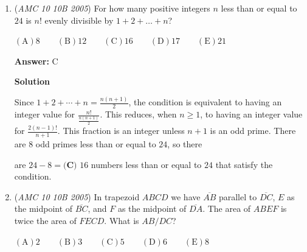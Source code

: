 \begin{enumerate}
 Hence, the answer is $\frac{q}{p} = \frac{45 \cdot 6 \cdot 4^2 \cdot 3^2}{10\cdot 4!} = \boxed{\textbf{(A) }162}$.

 



\textbf{Solution 2 (where the order does not matter)}

For probability $p$, there are $\binom{10}{1}=10$ ways to choose the number you want to show up $4$ times.

 Hence, the probability is $\frac{10}{\binom{40}{4}}$.

 For probability $q$, there are $\binom{10}{2}=45$ ways to choose the $2$ numbers you want to show up twice. There are $\binom{4}{2}\cdot\binom{4}{2}$ ways to pick which slips you want out of the $4$ of each.

 Hence, the probability is $\frac{45\cdot6\cdot6}{\binom{40}{4}}$

 Hence, $\frac{q}{p}=\frac{45\cdot6\cdot6}{10}=9\cdot6\cdot3=\boxed{\textbf{(A) }162}$.

 


	\item (\textit{AMC 10 10B 2005}) For how many positive integers $n$ less than or equal to $24$ is $n!$ evenly divisible by $1 + 2 + \ldots + n$?


 $\mathrm{(A)} 8 \qquad \mathrm{(B)} 12 \qquad \mathrm{(C)} 16 \qquad \mathrm{(D)} 17 \qquad \mathrm{(E)} 21$

 \textbf{Answer: }C



\textbf{Solution}

Since $1 + 2 + \cdots + n = \frac{n(n+1)}{2}$, the condition is equivalent to having an integer value for $\frac{n!} {\frac{n(n+1)}{2}}$. This reduces, when $n\ge 1$, to having an integer value for $\frac{2(n-1)!}{n+1}$. This fraction is an integer unless $n+1$ is an odd prime. There are $8$ odd primes less than or equal to $24$, so there 

 are $24 - 8 =  \boxed{\textbf{(C) }16}$ numbers less than or equal to $24$ that satisfy the condition.

 


	\item (\textit{AMC 10 10B 2005}) In trapezoid $ABCD$ we have $\overline{AB}$ parallel to $\overline{DC}$, $E$ as the midpoint of $\overline{BC}$, and $F$ as the midpoint of $\overline{DA}$. The area of $ABEF$ is twice the area of $FECD$. What is $AB/DC$?


 $\mathrm{(A)} 2 \qquad \mathrm{(B)} 3 \qquad \mathrm{(C)} 5 \qquad \mathrm{(D)} 6 \qquad \mathrm{(E)} 8$


\end{enumerate}
